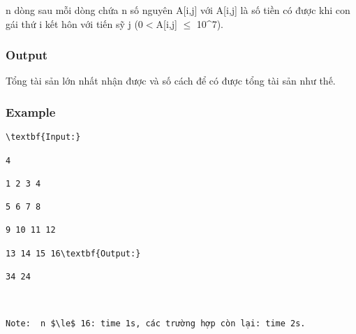    n dòng sau mỗi dòng chứa n số nguyên A[i,j] với A[i,j] là số tiền có được khi con gái thứ i kết hôn với tiến sỹ j (0$<$A[i,j] $\le$ 10\textasciicircum7).  

\subsubsection{   Output  }

   Tổng tài sản lớn nhất nhận được và số cách để có được tổng tài sản như thế.  

\subsubsection{   Example  }
\begin{verbatim}
\textbf{Input:}

4

1 2 3 4

5 6 7 8

9 10 11 12

13 14 15 16\textbf{Output:}

34 24

 

Note:  n $\le$ 16: time 1s, các trường hợp còn lại: time 2s.\end{verbatim}
